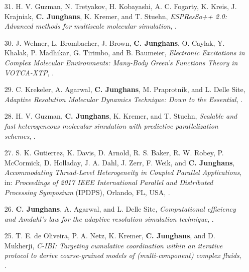 \documentclass{article}
\begin{document}
\begin{enumerate}
\item[31.] H. V. Guzman, N. Tretyakov, H. Kobayashi, A. C. Fogarty, K. Kreis, J. Krajniak, \textbf{C. Junghans}, K. Kremer, and T. Stuehn,
  \textit{ESPResSo++ 2.0: Advanced methods for multiscale molecular simulation},
  .

\item[30.] J. Wehner, L. Brombacher, J. Brown, \textbf{C. Junghans}, O. Caylak, Y. Khalak, P. Madhikar, G. Tirimbo, and B. Baumeier,
  \textit{Electronic Excitations in Complex Molecular Environments: Many-Body Green's Functions Theory in VOTCA-XTP},
  .

\item[29.] C. Krekeler, A. Agarwal, \textbf{C. Junghans}, M. Praprotnik, and L. Delle Site,
  \textit{Adaptive Resolution Molecular Dynamics Technique: Down to the Essential},
  .

\item[28.] H. V. Guzman, \textbf{C. Junghans}, K. Kremer, and T. Stuehn,
  \textit{Scalable and fast heterogeneous molecular simulation with predictive parallelization schemes},
  .

\item[27.] S. K. Gutierrez, K. Davis, D. Arnold, R. S. Baker, R. W. Robey, P. McCormick, D. Holladay, J. A. Dahl, J. Zerr, F. Weik, and \textbf{C. Junghans},
  \textit{Accommodating Thread-Level Heterogeneity in Coupled Parallel Applications},
  in: \textit{Proceedings of 2017 IEEE International Parallel and Distributed Processing Symposium} (IPDPS),
  Orlando, FL, USA, .

\item[26.] \textbf{C. Junghans}, A. Agarwal, and L. Delle Site,
  \textit{Computational efficiency and Amdahl’s law for the adaptive resolution simulation technique},
  .

\item[25.] T. E. de Oliveira, P. A. Netz, K. Kremer, \textbf{C. Junghans}, and D. Mukherji,
  \textit{C-IBI: Targeting cumulative coordination within an iterative protocol to derive coarse-grained models of (multi-component) complex fluids},
  .


\end{enumerate}
\end{document}
